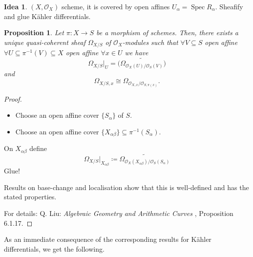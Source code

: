 \documentclass[12pt]{article}
\DeclareMathOperator{\Spec}{Spec}
\newtheorem*{proposition}{Proposition}
\theoremstyle{definition}
\newtheorem*{idea}{Idea}
\theoremstyle{remark}
\begin{document}
\begin{idea}
$(X,\mathcal{O}_X)$ scheme, it is covered by open affines $U_{\alpha}=\Spec R_{\alpha}$. Sheafify and glue K\"{a}hler differentials.
\end{idea}

\begin{proposition}
Let $\pi:X\rightarrow S$ be a morphism of schemes. Then, there exists a unique quasi-coherent sheaf $\Omega_{X/S}$ of $\mathcal{O}_X$-modules such that $\forall V\subseteq S$ open affine $\forall U\subseteq\pi^{-1}(V)\subseteq X$ open affine $\forall x\in U$ we have
\[\Omega_{X/S}|_U=\widetilde{\big(\Omega_{\mathcal{O}_X(U)/\mathcal{O}_S(V)}\big)}\]
and
\[\Omega_{X/S,x}\cong\Omega_{\mathcal{O}_{X,x}/\mathcal{O}_{S,\pi(x)}}.\]
\end{proposition}

\begin{proof}
\begin{itemize}[label=$-$]
\item Choose an open affine cover $\{S_{\alpha}\}$ of $S$.

\item Choose an open affine cover $\{X_{\alpha\beta}\}\subseteq\pi^{-1}(S_{\alpha})$.
\end{itemize}
On $X_{\alpha\beta}$ define
\[\Omega_{X/S}|_{X_{\alpha\beta}}\coloneqq\widetilde{\Omega_{\mathcal{O}_X(X_{\alpha\beta})/\mathcal{O}_S(S_{\alpha})}}\]
Glue!

Results on base-change and localisation show that this is well-defined and has the stated properties.

For details: Q. Liu: \emph{Algebraic Geometry and Arithmetic Curves} \cite{liu2002algebraic}, Proposition 6.1.17.
\end{proof}

As an immediate consequence of the corresponding results for K\"{a}hler differentials, we get the following.
\end{document}
